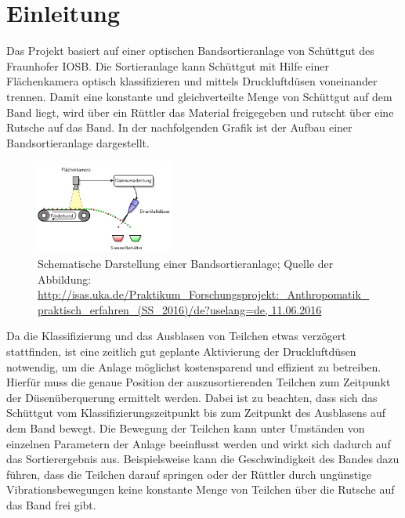 \section{Einleitung}

Das Projekt basiert auf einer optischen Bandsortieranlage von Schüttgut des Fraunhofer IOSB. Die Sortieranlage kann Schüttgut mit Hilfe einer Flächenkamera optisch klassifizieren und mittels Druckluftdüsen voneinander trennen. Damit eine konstante und gleichverteilte Menge von Schüttgut auf dem Band liegt, wird über ein Rüttler das Material freigegeben und rutscht über eine Rutsche auf das Band. In der nachfolgenden Grafik ist der Aufbau einer Bandsortieranlage dargestellt.

\begin{figure}[ht]
  \centering
  \includegraphics[width=0.4\textwidth]{images/k1-tracksort.png}
  \caption {Schematische Darstellung einer Bandsortieranlage; Quelle der Abbildung: \url{http://isas.uka.de/Praktikum\_Forschungsprojekt:\_Anthropomatik\_praktisch\_erfahren\_(SS\_2016)/de?uselang=de, 11.06.2016} }
 \label{fig:k1}
\end{figure}




Da die Klassifizierung und das Ausblasen von Teilchen etwas verzögert stattfinden, ist eine zeitlich gut geplante Aktivierung der Druckluftdüsen notwendig, um die Anlage möglichst kostensparend und effizient zu betreiben. Hierfür muss die genaue Position der auszusortierenden Teilchen zum Zeitpunkt der Düsenüberquerung ermittelt werden. Dabei ist zu beachten, dass sich das Schüttgut vom Klassifizierungszeitpunkt bis zum Zeitpunkt des Ausblasens auf dem Band bewegt. Die Bewegung der Teilchen kann unter Umständen von einzelnen Parametern der Anlage beeinflusst werden und wirkt sich dadurch auf das Sortierergebnis aus. Beispielsweise kann die Geschwindigkeit des Bandes dazu führen, dass die Teilchen darauf springen oder der Rüttler durch ungünstige Vibrationsbewegungen keine konstante Menge von Teilchen über die Rutsche auf das Band frei gibt. 

